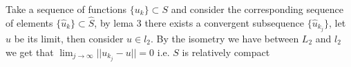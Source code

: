 \documentclass{article}
\begin{document}
Take a sequence of functions $\{u_k\}\subset S$ and consider the
corresponding sequence of elements $\{\hat u_k\}\subset \hat S$, by lema 3
there exists a convergent subsequence $\{\hat u_{k_j}\}$, let $\hat u$ be its
limit, then consider $u\in l_2$. By the isometry we have between $L_2$ and $l_2$
we get that $\lim_{j\to \infty}||u_{k_j}-u||=0$ i.e. $S$ is relatively compact
\end{document}
